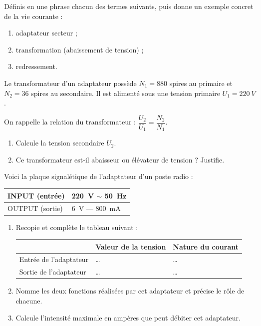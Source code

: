 \documentclass[11pt]{article}
\newcounter{popsec}
\newcounter{popsub}
\newcommand{\courssub}[1]{%
  \stepcounter{popsub}%
  \par\vspace{9pt}\noindent{\popxbold\fontsize{11.5}{13}\selectfont\color{popink}{\color{poporange}\thepopsec.\thepopsub}\hspace{6pt}#1}\par\nopagebreak\vspace{4pt}
}
\begin{document}
\begin{exercice}[Définitions]
Définis en une phrase chacun des termes suivants, puis donne un exemple concret de la vie courante :
\begin{enumerate}
\item adaptateur secteur ;
\item transformation (abaissement de tension) ;
\item redressement.
\end{enumerate}
\end{exercice}

\begin{exercice}
Le transformateur d'un adaptateur possède $N_1 = 880$ spires au primaire et $N_2 = 36$ spires au secondaire. Il est alimenté sous une tension primaire $U_1 = \SI{220}{V}$.

On rappelle la relation du transformateur : $\dfrac{U_2}{U_1} = \dfrac{N_2}{N_1}$.

\begin{enumerate}
\item Calcule la tension secondaire $U_2$.
\item Ce transformateur est-il abaisseur ou élévateur de tension ? Justifie.
\end{enumerate}
\end{exercice}

\courssub{Je m'entraîne}

\begin{exercice}
Voici la plaque signalétique de l'adaptateur d'un poste radio :

\begin{center}
\begin{tabularx}{\linewidth}{|l|X|}
\hline
\rowcolor{popblueL} INPUT (entrée) & \SI{220}{V} $\sim$ \SI{50}{Hz} \\
\hline
OUTPUT (sortie) & \SI{6}{V} $\text{---}$ \SI{800}{mA} \\
\hline
\end{tabularx}
\end{center}

\begin{enumerate}
\item Recopie et complète le tableau suivant :
\begin{center}
\begin{tabularx}{\linewidth}{|X|X|X|}
\hline
\rowcolor{popblueL} & Valeur de la tension & Nature du courant \\
\hline
Entrée de l'adaptateur & \ldots & \ldots \\
\hline
Sortie de l'adaptateur & \ldots & \ldots \\
\hline
\end{tabularx}
\end{center}
\item Nomme les deux fonctions réalisées par cet adaptateur et précise le rôle de chacune.
\item Calcule l'intensité maximale en ampères que peut débiter cet adaptateur.
\end{enumerate}
\end{exercice}
\end{document}
